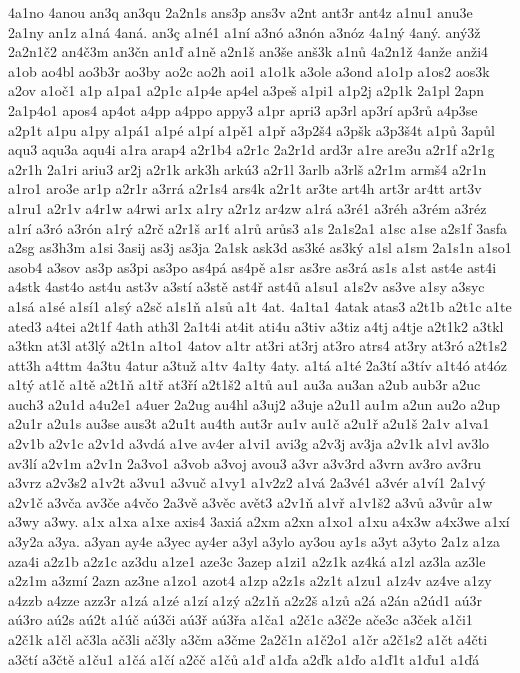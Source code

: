 4a1no
4anou
an3q
an3qu
2a2n1s
ans3p
ans3v
a2nt
ant3r
ant4z
a1nu1
anu3e
2a1ny
an1z
a1ná
4aná.
an3ç
a1né1
a1ní
a3nó
a3nón
a3nóz
4a1ný
4aný.
aný3ž
2a2n1č2
an4č3m
an3čn
an1ď
a1ně
a2n1š
an3še
anš3k
a1nů
4a2n1ž
4anže
anži4
a1ob
ao4bl
ao3b3r
ao3by
ao2c
ao2h
aoi1
a1o1k
a3ole
a3ond
a1o1p
a1os2
aos3k
a2ov
a1oč1
a1p
a1pa1
a2p1c
a1p4e
ap4el
a3peš
a1pi1
a1p2j
a2p1k
2a1pl
2apn
2a1p4o1
apos4
ap4ot
a4pp
a4ppo
appy3
a1pr
apri3
ap3rl
ap3rí
ap3rů
a4p3se
a2p1t
a1pu
a1py
a1pá1
a1pé
a1pí
a1pě1
a1př
a3p2š4
a3pšk
a3p3š4t
a1pů
3apůl
aqu3
aqu3a
aqu4i
a1ra
arap4
a2r1b4
a2r1c
2a2r1d
ard3r
a1re
are3u
a2r1f
a2r1g
a2r1h
2a1ri
ariu3
ar2j
a2r1k
ark3h
arkú3
a2r1l
3arlb
a3rlš
a2r1m
armš4
a2r1n
a1ro1
aro3e
ar1p
a2r1r
a3rrá
a2r1s4
ars4k
a2r1t
ar3te
art4h
art3r
ar4tt
art3v
a1ru1
a2r1v
a4r1w
a4rwi
ar1x
a1ry
a2r1z
ar4zw
a1rá
a3ré1
a3réh
a3rém
a3réz
a1rí
a3ró
a3rón
a1rý
a2rč
a2r1š
ar1ť
a1rů
arůs3
a1s
2a1s2a1
a1sc
a1se
a2s1f
3asfa
a2sg
as3h3m
a1si
3asij
as3j
as3ja
2a1sk
ask3d
as3ké
as3ký
a1sl
a1sm
2a1s1n
a1so1
asob4
a3sov
as3p
as3pi
as3po
as4pá
as4pě
a1sr
as3re
as3rá
as1s
a1st
ast4e
ast4i
a4stk
4ast4o
ast4u
ast3v
a3stí
a3stě
ast4ř
ast4ů
a1su1
a1s2v
as3ve
a1sy
a3syc
a1sá
a1sé
a1sí1
a1sý
a2sč
a1s1ň
a1sů
a1t
4at.
4a1ta1
4atak
atas3
a2t1b
a2t1c
a1te
ated3
a4tei
a2t1f
4ath
ath3l
2a1t4i
at4it
ati4u
a3tiv
a3tiz
a4tj
a4tje
a2t1k2
a3tkl
a3tkn
at3l
at3lý
a2t1n
a1to1
4atov
a1tr
at3ri
at3rj
at3ro
atrs4
at3ry
at3ró
a2t1s2
att3h
a4ttm
4a3tu
4atur
a3tuž
a1tv
4a1ty
4aty.
a1tá
a1té
2a3tí
a3tív
a1t4ó
at4óz
a1tý
at1č
a1tě
a2t1ň
a1tř
at3ří
a2t1š2
a1tů
au1
au3a
au3an
a2ub
aub3r
a2uc
auch3
a2u1d
a4u2e1
a4uer
2a2ug
au4hl
a3uj2
a3uje
a2u1l
au1m
a2un
au2o
a2up
a2u1r
a2u1s
au3se
aus3t
a2u1t
au4th
aut3r
au1v
au1č
a2u1ř
a2u1š
2a1v
a1va1
a2v1b
a2v1c
a2v1d
a3vdá
a1ve
av4er
a1vi1
avi3g
a2v3j
av3ja
a2v1k
a1vl
av3lo
av3lí
a2v1m
a2v1n
2a3vo1
a3vob
a3voj
avou3
a3vr
a3v3rd
a3vrn
av3ro
av3ru
a3vrz
a2v3s2
a1v2t
a3vu1
a3vuč
a1vy1
a1v2z2
a1vá
2a3vé1
a3vér
a1ví1
2a1vý
a2v1č
a3vča
av3če
a4včo
2a3vě
a3věc
avět3
a2v1ň
a1vř
a1v1š2
a3vů
a3vůr
a1w
a3wy
a3wy.
a1x
a1xa
a1xe
axis4
3axiá
a2xm
a2xn
a1xo1
a1xu
a4x3w
a4x3we
a1xí
a3y2a
a3ya.
a3yan
ay4e
a3yec
ay4er
a3yl
a3ylo
ay3ou
ay1s
a3yt
a3yto
2a1z
a1za
aza4i
a2z1b
a2z1c
az3du
a1ze1
aze3c
3azep
a1zi1
a2z1k
az4ká
a1zl
az3la
az3le
a2z1m
a3zmí
2azn
az3ne
a1zo1
azot4
a1zp
a2z1s
a2z1t
a1zu1
a1z4v
az4ve
a1zy
a4zzb
a4zze
azz3r
a1zá
a1zé
a1zí
a1zý
a2z1ň
a2z2š
a1zů
a2á
a2án
a2úd1
aú3r
aú3ro
aú2s
aú2t
a1úč
aú3či
aú3ř
aú3řa
a1ča1
a2č1c
a3č2e
ače3c
a3ček
a1či1
a2č1k
a1čl
ač3la
ač3li
ač3ly
a3čm
a3čme
2a2č1n
a1č2o1
a1čr
a2č1s2
a1čt
a4čti
a3čtí
a3čtě
a1ču1
a1čá
a1čí
a2čč
a1čů
a1ď
a1ďa
a2ďk
a1ďo
a1ď1t
a1ďu1
a1ďá
